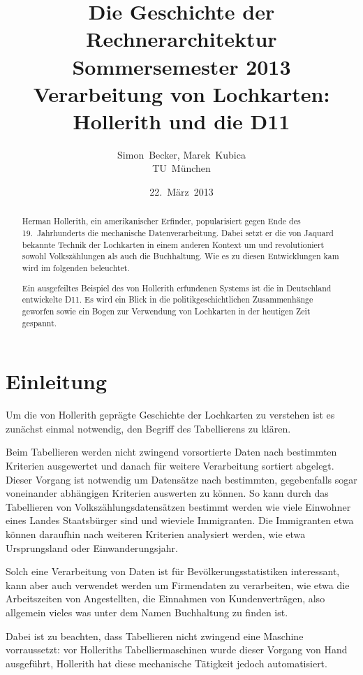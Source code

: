 \documentclass[parskip=half]{scrartcl}
\author{Simon~Becker, Marek~Kubica\\TU~München}
\title{Die Geschichte der Rechnerarchitektur\\
Sommersemester 2013\\
Verarbeitung von Lochkarten: Hollerith und die D11}
\date{22.~März~2013}
\begin{document}
\maketitle

\begin{abstract}

Herman Hollerith, ein amerikanischer Erfinder, popularisiert gegen Ende des
19.~Jahrhunderts die mechanische Datenverarbeitung. Dabei setzt er die von
Jaquard bekannte Technik der Lochkarten in einem anderen Kontext um und
revolutioniert sowohl Volkszählungen als auch die Buchhaltung. Wie es zu diesen
Entwicklungen kam wird im folgenden beleuchtet.

Ein ausgefeiltes Beispiel des von Hollerith erfundenen Systems ist die in
Deutschland entwickelte D11. Es wird ein Blick in die politikgeschichtlichen
Zusammenhänge geworfen sowie ein Bogen zur Verwendung von Lochkarten in der
heutigen Zeit gespannt.

\end{abstract}

\section{Einleitung}
\label{sec:einleitung}

Um die von Hollerith geprägte Geschichte der Lochkarten zu verstehen ist es
zunächst einmal notwendig, den Begriff des Tabellierens zu klären.

Beim Tabellieren werden nicht zwingend vorsortierte Daten nach bestimmten
Kriterien ausgewertet und danach für weitere Verarbeitung sortiert abgelegt.
Dieser Vorgang ist notwendig um Datensätze nach bestimmten, gegebenfalls sogar
voneinander abhängigen Kriterien auswerten zu können. So kann durch das
Tabellieren von Volkszählungsdatensätzen bestimmt werden wie viele Einwohner
eines Landes Staatsbürger sind und wieviele Immigranten. Die Immigranten etwa
können daraufhin nach weiteren Kriterien analysiert werden, wie etwa
Ursprungsland oder Einwanderungsjahr.

Solch eine Verarbeitung von Daten ist für Bevölkerungsstatistiken interessant,
kann aber auch verwendet werden um Firmendaten zu verarbeiten, wie etwa die
Arbeitszeiten von Angestellten, die Einnahmen von Kundenverträgen, also
allgemein vieles was unter dem Namen Buchhaltung zu finden ist.

Dabei ist zu beachten, dass Tabellieren nicht zwingend eine Maschine
vorraussetzt: vor Holleriths Tabelliermaschinen wurde dieser Vorgang von Hand
ausgeführt, Hollerith hat diese mechanische Tätigkeit jedoch automatisiert.
\end{document}
